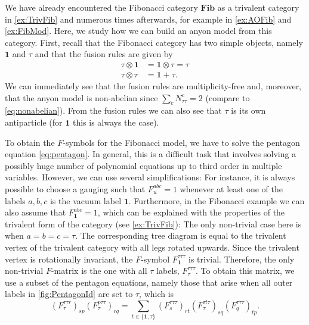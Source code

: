 \begin{exmp}
	\label{ex:FibAnyon}
	We have already encountered the Fibonacci category $\mathbf{Fib}$ as a trivalent category in \cref{ex:TrivFib} and numerous times afterwards, for example in \cref{ex:AOFib} and \cref{ex:FibMod}. Here, we study how we can build an anyon model from this category. First, recall that the Fibonacci category has two simple objects, namely $\mathbf{1}$ and $\tau$ and that the fusion rules are given by
		\begin{align}
			\tau\otimes\mathbf{1}&=\mathbf{1}\otimes\tau=\tau\\
			\tau\otimes\tau&=\mathbf{1}+\tau.
		\end{align}
	We can immediately see that the fusion rules are multiplicity-free and, moreover, that the anyon model is non-abelian since $\sum_c N_{\tau\tau}^c=2$ (compare to \cref{eq:nonabelian}). From the fusion rules we can also see that $\tau$ is its own antiparticle (for $\mathbf{1}$ this is always the case). 
	
	
	
	\noindent	
	To obtain the $F$-symbols for the Fibonacci model, we have to solve the pentagon equation \cref{eq:pentagon}. In general, this is a difficult task that involves solving a possibly huge number of polynomial equations up to third order in multiple variables. However, we can use several simplifications: For instance, it is always possible to choose a gauging such that $F_u^{abc}=1$ whenever at least one of the labels $a,b,c$ is the vacuum label $\mathbf{1}$. Furthermore, in the Fibonacci example we can also assume that $F_\mathbf{1}^{abc}=1$, which can be explained with the properties of the trivalent form of the category (see \cref{ex:TrivFib}): The only non-trivial case here is when $a=b=c=\tau$. The corresponding tree diagram is equal to the trivalent vertex of the trivalent category with all legs rotated upwards. Since the trivalent vertex is rotationally invariant, the $F$-symbol $F_\mathbf{1}^{\tau\tau\tau}$ is trivial. Therefore, the only non-trivial $F$-matrix is the one with all $\tau$ labels, $F_\tau^{\tau\tau\tau}$. To obtain this matrix, we use a subset of the pentagon equations, namely those that arise when all outer labels in \cref{fig:PentagonId} are set to $\tau$, which is
		\begin{equation}
			\left(F_\tau^{\tau\tau r}\right)_{sp}\left(F_\tau^{p\tau\tau}\right)_{rq}=\sum_{t\in\{\mathbf{1},\tau\}}\left(F_s^{\tau\tau\tau}\right)_{rt}\left(F_\tau^{\tau t\tau}\right)_{sq}\left(F_q^{\tau\tau\tau}\right)_{tp}.
		\end{equation}
		

\end{exmp}
